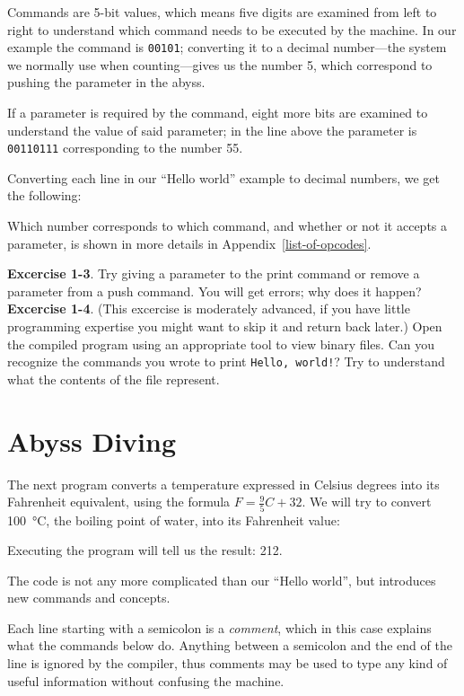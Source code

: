 \documentclass[11pt,a4paper,draft]{book}
\begin{document}
Commands are 5-bit values, which means five digits are examined from
left to right to understand which command needs to be executed by the
machine. In our example the command is \verb|00101|; converting it to
a decimal number---the system we normally use when counting---gives us
the number 5, which correspond to pushing the parameter in the abyss.

If a parameter is required by the command, eight more bits are
examined to understand the value of said parameter; in the line above
the parameter is \verb|00110111| corresponding to the number 55.

Converting each line in our \enquote{Hello world} example to
decimal numbers, we get the following:


Which number corresponds to which command, and whether or not it
accepts a parameter, is shown in more details in
Appendix~\ref{list-of-opcodes}.

\textbf{Excercise 1-3}. Try giving a parameter to the print command or
remove a parameter from a push command. You will get errors; why does
it happen? \\
\textbf{Excercise 1-4}. (This excercise is moderately advanced, if you
have little programming expertise you might want to skip it and return
back later.) Open the compiled program using an appropriate tool to
view binary files. Can you recognize the commands you wrote to print
\verb|Hello, world!|? Try to understand what the contents of the file
represent.

\section{Abyss Diving}
The next program converts a temperature expressed in Celsius degrees
into its Fahrenheit equivalent, using the formula \(F = \frac{9}{5}C + 32\).
We will try to convert \qty[mode=text]{100}{\degreeCelsius}, the
boiling point of water, into its Fahrenheit value:


Executing the program will tell us the result:
\qty[mode=text]{212}{\degreeFahrenheit}.

The code is not any more complicated than our \enquote{Hello world},
but introduces new commands and concepts.

Each line starting with a semicolon is a \emph{comment}, which in this
case explains what the commands below do. Anything between a semicolon
and the end of the line is ignored by the compiler, thus comments may
be used to type any kind of useful information without confusing the
machine.
\end{document}
